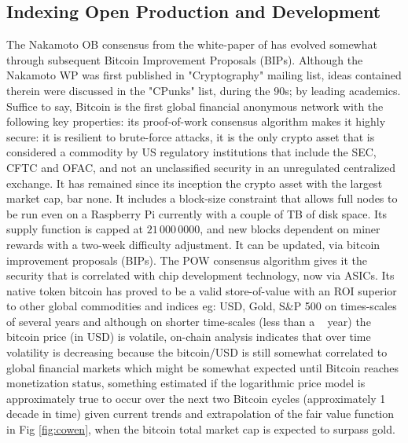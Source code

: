 \documentclass[final,5p,times,twocolumn,authoryear]{elsarticle}
\begin{document}
\subsection{Indexing Open Production and Development}
The Nakamoto OB consensus from the white-paper of \cite{nak2009} has evolved somewhat through subsequent Bitcoin Improvement Proposals (BIPs). Although the Nakamoto WP was first published in "Cryptography" mailing list, ideas contained therein were discussed in the "CPunks" list, during the 90s; by leading academics. Suffice to say, Bitcoin is the first global financial anonymous network with the following key properties: its proof-of-work consensus algorithm makes it highly secure: it is resilient to brute-force attacks, it is the only crypto asset that is considered a commodity by US regulatory institutions that include the SEC, CFTC and OFAC, and not an unclassified security in an unregulated centralized exchange. It has remained since its inception the crypto asset with the largest market cap, bar none. It includes a block-size constraint that allows full nodes to be run even on a Raspberry Pi currently with a couple of TB of disk space. Its supply function is capped at $21\,000\,0000$, and new blocks dependent on miner rewards with a two-week difficulty adjustment. It can be updated, via bitcoin improvement proposals (BIPs). The POW consensus algorithm gives it the security that is correlated with chip development technology, now via ASICs. Its native token bitcoin has proved to be a valid store-of-value with an ROI superior to other global commodities and indices eg: USD, Gold, S\&P 500 on times-scales of several years and although on shorter time-scales (less than a ~ year) the bitcoin price (in USD) is  volatile, on-chain analysis indicates that over time volatility is decreasing because the bitcoin/USD is still somewhat correlated to global financial markets  \citep{wang2022} which might be somewhat expected until Bitcoin reaches monetization status, something estimated if the logarithmic price model is approximately true to occur over the next two Bitcoin cycles (approximately 1 decade in time) given current trends and extrapolation of the fair value function in Fig \ref{fig:cowen},  when the bitcoin total market cap is expected to surpass gold. 
\end{document}
